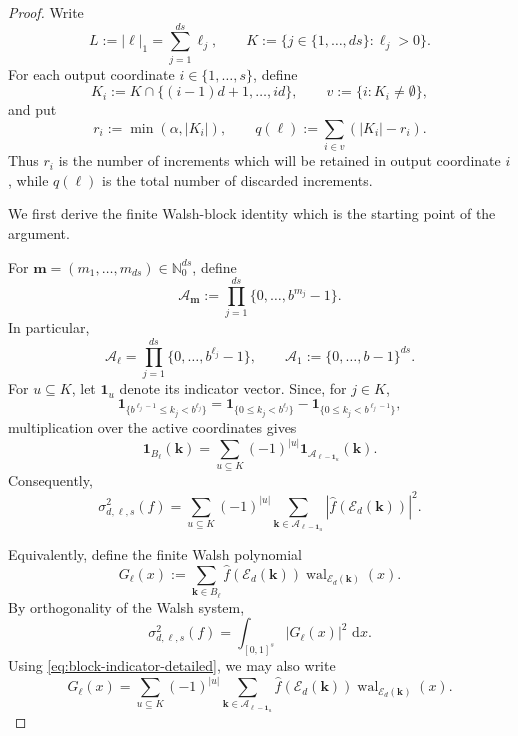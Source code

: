 \documentclass[10pt,a4paper]{amsart}
\newcommand{\E}{\mathcal E}
\newcommand{\Nzero}{\mathbb N_0}
\newcommand{\dd}{\,\mathrm d}
\newcommand{\wal}{\operatorname{wal}}
\begin{document}
\begin{proof}
Write
\[
 L:=|\boldsymbol\ell|_1
   =\sum_{j=1}^{ds}\ell_j,
 \qquad
 K:=\{j\in\{1,\ldots,ds\}:\ell_j>0\}.
\]
For each output coordinate $i\in\{1,\ldots,s\}$, define
\[
 K_i
 :=
 K\cap\{(i-1)d+1,\ldots,id\},
 \qquad
 v:=\{i:K_i\neq\emptyset\},
\]
and put
\[
 r_i:=\min(\alpha,|K_i|),
 \qquad
 q(\boldsymbol\ell)
 :=
 \sum_{i\in v}(|K_i|-r_i).
\]
Thus $r_i$ is the number of increments which will be retained in
output coordinate $i$, while $q(\boldsymbol\ell)$ is the total
number of discarded increments.

We first derive the finite Walsh-block identity which is the starting
point of the argument.

For
$\boldsymbol m=(m_1,\ldots,m_{ds})\in\Nzero^{ds}$, define
\[
 \mathcal A_{\boldsymbol m}
 :=
 \prod_{j=1}^{ds}\{0,\ldots,b^{m_j}-1\}.
\]
In particular,
\[
 \mathcal A_{\boldsymbol\ell}
 =
 \prod_{j=1}^{ds}\{0,\ldots,b^{\ell_j}-1\},
 \qquad
 \mathcal A_1:=\{0,\ldots,b-1\}^{ds}.
\]
For $u\subseteq K$, let $\boldsymbol1_u$ denote its indicator
vector.  Since, for $j\in K$,
\[
 \mathbf 1_{\{b^{\ell_j-1}\le k_j<b^{\ell_j}\}}
 =
 \mathbf 1_{\{0\le k_j<b^{\ell_j}\}}
 -
 \mathbf 1_{\{0\le k_j<b^{\ell_j-1}\}},
\]
multiplication over the active coordinates gives
\begin{equation}\label{eq:block-indicator-detailed}
 \mathbf1_{B_{\boldsymbol\ell}}(\boldsymbol k)
 =
 \sum_{u\subseteq K}
 (-1)^{|u|}
 \mathbf1_{\mathcal A_{\boldsymbol\ell-\boldsymbol1_u}}
 (\boldsymbol k).
\end{equation}
Consequently,
\begin{equation}\label{eq:block-inclusion-exclusion-detailed}
 \sigma_{d,\boldsymbol\ell,s}^2(f)
 =
 \sum_{u\subseteq K}(-1)^{|u|}
 \sum_{\boldsymbol k\in
       \mathcal A_{\boldsymbol\ell-\boldsymbol1_u}}
 \left|
   \widehat f(\E_d(\boldsymbol k))
 \right|^2.
\end{equation}

Equivalently, define the finite Walsh polynomial
\[
 G_{\boldsymbol\ell}(x)
 :=
 \sum_{\boldsymbol k\in B_{\boldsymbol\ell}}
 \widehat f(\E_d(\boldsymbol k))
 \wal_{\E_d(\boldsymbol k)}(x).
\]
By orthogonality of the Walsh system,
\begin{equation}\label{eq:block-parseval-detailed}
 \sigma_{d,\boldsymbol\ell,s}^2(f)
 =
 \int_{[0,1]^s}|G_{\boldsymbol\ell}(x)|^2\,\dd x.
\end{equation}
Using \eqref{eq:block-indicator-detailed}, we may also write
\begin{equation}\label{eq:G-inclusion-exclusion-detailed}
 G_{\boldsymbol\ell}(x)
 =
 \sum_{u\subseteq K}(-1)^{|u|}
 \sum_{\boldsymbol k\in
       \mathcal A_{\boldsymbol\ell-\boldsymbol1_u}}
 \widehat f(\E_d(\boldsymbol k))
 \wal_{\E_d(\boldsymbol k)}(x).
\end{equation}


\end{proof}
\end{document}
